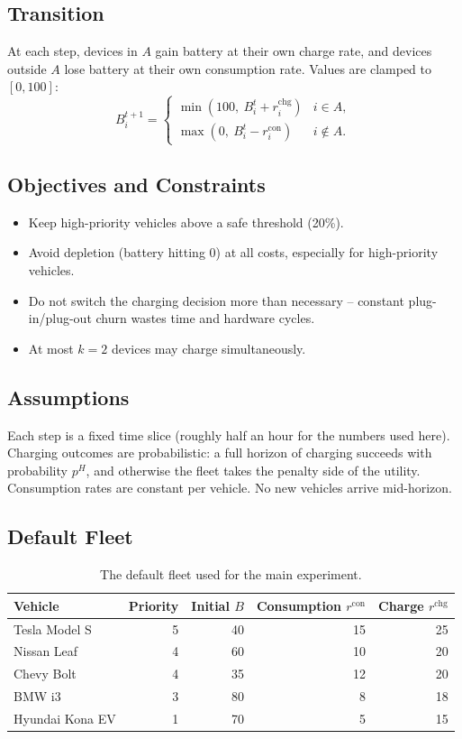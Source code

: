 \documentclass[11pt,a4paper]{article}
\begin{document}
\subsection*{Transition}
At each step, devices in $A$ gain battery at their own charge rate, and
devices outside $A$ lose battery at their own consumption rate. Values are
clamped to $[0, 100]$:
\[
    B_i^{t+1} =
    \begin{cases}
        \min(100,\ B_i^{t} + r_i^{\text{chg}}) & i \in A,\\[2pt]
        \max(0,\ B_i^{t} - r_i^{\text{con}}) & i \notin A.
    \end{cases}
\]

\subsection*{Objectives and Constraints}
\begin{itemize}[leftmargin=1.3em, itemsep=2pt]
    \item Keep high-priority vehicles above a safe threshold (20\%).
    \item Avoid depletion (battery hitting 0) at all costs, especially for
          high-priority vehicles.
    \item Do not switch the charging decision more than necessary -- constant
          plug-in/plug-out churn wastes time and hardware cycles.
    \item At most $k=2$ devices may charge simultaneously.
\end{itemize}

\subsection*{Assumptions}
Each step is a fixed time slice (roughly half an hour for the numbers used
here). Charging outcomes are probabilistic: a full horizon of charging
succeeds with probability $p^H$, and otherwise the fleet takes the penalty side
of the utility. Consumption rates are constant per vehicle. No new vehicles
arrive mid-horizon.

\subsection*{Default Fleet}
\begin{table}[H]
\centering
\small
\begin{tabular}{lrrrr}
\toprule
Vehicle & Priority & Initial $B$ & Consumption $r^{\text{con}}$ & Charge $r^{\text{chg}}$ \\
\midrule
Tesla Model S   & 5 & 40 & 15 & 25 \\
Nissan Leaf     & 4 & 60 & 10 & 20 \\
Chevy Bolt      & 4 & 35 & 12 & 20 \\
BMW i3          & 3 & 80 & 8  & 18 \\
Hyundai Kona EV & 1 & 70 & 5  & 15 \\
\bottomrule
\end{tabular}
\caption{The default fleet used for the main experiment.}
\end{table}
\end{document}
